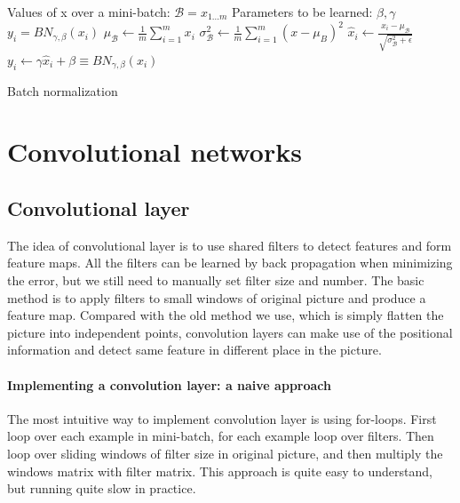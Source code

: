 \documentclass{article}
\begin{document}
\begin{algorithm}[ht]
\begin{algorithmic}
    Values of x over a mini-batch: $\mathcal{B} = {x_{1...m}}$
    Parameters to be learned: $\beta, \gamma$ 
    $y_i = BN_{\gamma,\beta}(x_i)$ 
   \STATE $\mu_{\mathcal{B}} \gets \frac{1}{m} \sum\limits_{i=1}^{m} x_i$
   \STATE $ \sigma^2_{\mathcal{B}} \gets \frac{1}{m} \sum\limits_{i=1}^{m} (x- \mu_B)^2 $
   \STATE $ \hat x_i \gets \frac{x_i-\mu_\mathcal{B}}{\sqrt{\sigma^2_{\mathcal{B}}+\epsilon}} $
   \STATE $ y_i  \gets \gamma \hat x_i + \beta \equiv  BN_{\gamma,\beta}(x_i) $
   
\end{algorithmic}
  \caption{Batch normalization }
  \label{alg:batchnorm}
\end{algorithm}






\section{Convolutional networks}
\subsection{Convolutional layer}

The idea of convolutional layer is to use shared filters to detect features and form feature maps. All the filters can be learned by back propagation when minimizing the error, but we still need to manually set filter size and number. The basic method is to apply filters to small windows of original picture and produce a feature map. Compared with the old method we use, which is simply flatten the picture into independent points, convolution layers can make use of the positional information and detect same feature in different place in the picture.

\paragraph{Implementing a convolution layer: a naive approach }
The most intuitive way to implement convolution layer is using for-loops. First loop over each example in mini-batch, for each example loop over filters. Then loop over sliding windows of filter size in original picture, and then multiply the windows matrix with filter matrix. This approach is quite easy to understand, but running quite slow in practice.
\end{document}
